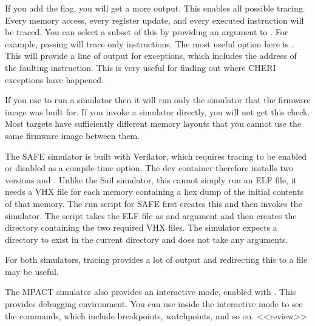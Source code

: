 
If you add the  flag, you will get a  more output.
This enables all possible tracing.
Every memory access, every register update, and every executed instruction will be traced.
You can select a subset of this by providing an argument to .
For example, passing  will trace only instructions.
The most useful option here is .
This will provide a line of output for exceptions, which includes the address of the faulting instruction.
This is very useful for finding out where CHERI exceptions have happened.

\begin{caution}
	If you use  to run a simulator then it will run only the simulator that the firmware image was built for.
	If you invoke a simulator directly, you will not get this check.
	Most targets have sufficiently different memory layouts that you cannot use the same firmware image between them.
\end{caution}

The SAFE simulator is built with Verilator, which requires tracing to be enabled or disabled as a compile-time option.
The dev container therefore installs two versions  and .
Unlike the Sail simulator, this cannot simply run an ELF file, it needs a VHX file for each memory containing a hex dump of the initial contents of that memory.
The run script for SAFE first creates this and then invokes the simulator.
The  script takes the ELF file as and argument and then creates the  directory containing the two required VHX files.
The simulator expects a  directory to exist in the current directory and does not take any arguments.

For both simulators, tracing provides a lot of output and redirecting this to a file may be useful.

The MPACT simulator also provides an interactive mode, enabled with .
This provides debugging environment.
You can use  inside the interactive mode to see the commands, which include breakpoints, watchpoints, and so on.
<<review>>
